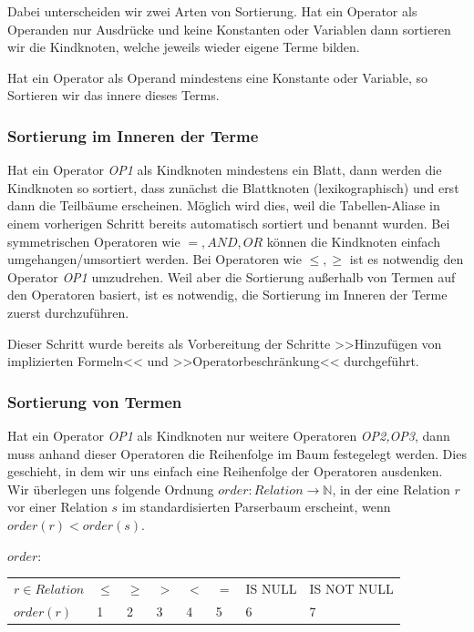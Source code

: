 Dabei unterscheiden wir zwei Arten von Sortierung. Hat ein Operator als Operanden nur Ausdrücke und keine Konstanten oder Variablen dann sortieren wir die Kindknoten, welche jeweils wieder eigene Terme bilden.

Hat ein Operator als Operand mindestens eine Konstante oder Variable, so Sortieren wir das innere dieses Terms.

\subsubsection{Sortierung im Inneren der Terme}

Hat ein Operator \textit{OP1} als Kindknoten mindestens ein Blatt, dann werden die Kindknoten so sortiert, dass zunächst die Blattknoten (lexikographisch) und erst dann die Teilbäume erscheinen. Möglich wird dies, weil die Tabellen-Aliase in einem vorherigen Schritt bereits automatisch sortiert und benannt wurden. Bei symmetrischen Operatoren wie $=,  \textit{AND}, \textit{OR}$ können die Kindknoten einfach umgehangen/umsortiert werden. Bei Operatoren wie $\le,\ge$ ist es notwendig den Operator \textit{OP1} umzudrehen. Weil aber die Sortierung außerhalb von Termen auf den Operatoren basiert, ist es notwendig, die Sortierung im Inneren der Terme zuerst durchzuführen.

Dieser Schritt wurde bereits als Vorbereitung der Schritte >>Hinzufügen von implizierten Formeln<< und >>Operatorbeschränkung<< durchgeführt. 

\subsubsection{Sortierung von Termen}

Hat ein Operator \textit{OP1} als Kindknoten nur weitere Operatoren \textit{OP2,OP3}, dann muss anhand dieser Operatoren die Reihenfolge im Baum festegelegt werden. Dies geschieht, in dem wir uns einfach eine Reihenfolge der Operatoren ausdenken. Wir überlegen uns folgende Ordnung $order:\textit{Relation}\to\mathbb{N}$, in der eine Relation $r$ vor einer Relation $s$ im standardisierten Parserbaum erscheint, wenn $order(r) < order(s)$.

$order:$\\

\begin{tabular}{|llllllll|}
\hline
$r\in \textit{Relation}$ & $\le$ & $\ge$ & $>$ & $<$ & $=$ & IS NULL & IS NOT NULL  \\
$\textit{order}(r)$ & 1 & 2 & 3 & 4 & 5 & 6 & 7\\ 
\hline
\end{tabular}\\


